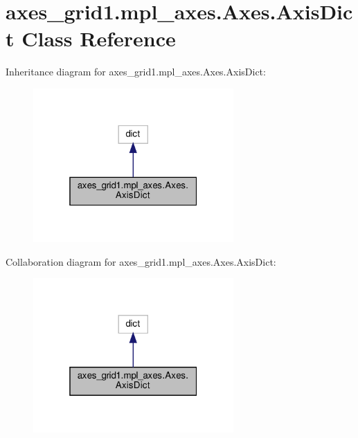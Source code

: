 \hypertarget{classaxes__grid1_1_1mpl__axes_1_1Axes_1_1AxisDict}{}\section{axes\+\_\+grid1.\+mpl\+\_\+axes.\+Axes.\+Axis\+Dict Class Reference}
\label{classaxes__grid1_1_1mpl__axes_1_1Axes_1_1AxisDict}


Inheritance diagram for axes\+\_\+grid1.\+mpl\+\_\+axes.\+Axes.\+Axis\+Dict\+:
\nopagebreak
\begin{figure}[H]
\begin{center}
\leavevmode
\includegraphics[width=217pt]{classaxes__grid1_1_1mpl__axes_1_1Axes_1_1AxisDict__inherit__graph}
\end{center}
\end{figure}


Collaboration diagram for axes\+\_\+grid1.\+mpl\+\_\+axes.\+Axes.\+Axis\+Dict\+:
\nopagebreak
\begin{figure}[H]
\begin{center}
\leavevmode
\includegraphics[width=217pt]{classaxes__grid1_1_1mpl__axes_1_1Axes_1_1AxisDict__coll__graph}
\end{center}
\end{figure}
